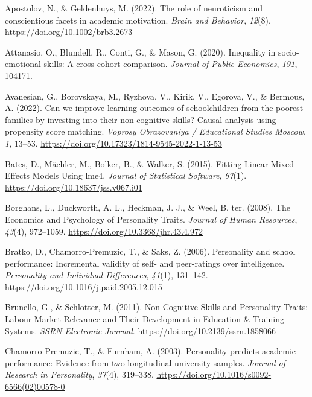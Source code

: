 \documentclass{article}
\newlength{\cslhangindent}
\newlength{\cslentryspacingunit} %
\newenvironment{CSLReferences}[2] %
 {%
  \setlength{\parindent}{0pt}
  \ifodd #1
  \let\oldpar\par
  \def\par{\hangindent=\cslhangindent\oldpar}
  \fi
  \setlength{\parskip}{#2\cslentryspacingunit}
 }%
 {}
\begin{document}
\hypertarget{refs}{}
\begin{CSLReferences}{1}{0}
\leavevmode{}%
Apostolov, N., \& Geldenhuys, M. (2022). The role of neuroticism and
conscientious facets in academic motivation. \emph{Brain and Behavior},
\emph{12}(8). \url{https://doi.org/10.1002/brb3.2673}

\leavevmode{}%
Attanasio, O., Blundell, R., Conti, G., \& Mason, G. (2020). Inequality
in socio-emotional skills: A cross-cohort comparison. \emph{Journal of
Public Economics}, \emph{191}, 104171.

\leavevmode{}%
Avanesian, G., Borovskaya, M., Ryzhova, V., Kirik, V., Egorova, V., \&
Bermous, A. (2022). Can we improve learning outcomes of schoolchildren
from the poorest families by investing into their non-cognitive skills?
Causal analysis using propensity score matching. \emph{Voprosy
Obrazovaniya / Educational Studies Moscow}, \emph{1}, 13--53.
\url{https://doi.org/10.17323/1814-9545-2022-1-13-53}

\leavevmode{}%
Bates, D., Mächler, M., Bolker, B., \& Walker, S. (2015). Fitting Linear
Mixed-Effects Models Using lme4. \emph{Journal of Statistical Software},
\emph{67}(1). \url{https://doi.org/10.18637/jss.v067.i01}

\leavevmode{}%
Borghans, L., Duckworth, A. L., Heckman, J. J., \& Weel, B. ter. (2008).
The Economics and Psychology of Personality Traits. \emph{Journal of
Human Resources}, \emph{43}(4), 972--1059.
\url{https://doi.org/10.3368/jhr.43.4.972}

\leavevmode{}%
Bratko, D., Chamorro-Premuzic, T., \& Saks, Z. (2006). Personality and
school performance: Incremental validity of self- and peer-ratings over
intelligence. \emph{Personality and Individual Differences},
\emph{41}(1), 131--142. \url{https://doi.org/10.1016/j.paid.2005.12.015}

\leavevmode{}%
Brunello, G., \& Schlotter, M. (2011). Non-Cognitive Skills and
Personality Traits: Labour Market Relevance and Their Development in
Education \& Training Systems. \emph{SSRN Electronic Journal}.
\url{https://doi.org/10.2139/ssrn.1858066}

\leavevmode{}%
Chamorro-Premuzic, T., \& Furnham, A. (2003). Personality predicts
academic performance: Evidence from two longitudinal university samples.
\emph{Journal of Research in Personality}, \emph{37}(4), 319--338.
\url{https://doi.org/10.1016/s0092-6566(02)00578-0}


\end{CSLReferences}
\end{document}
